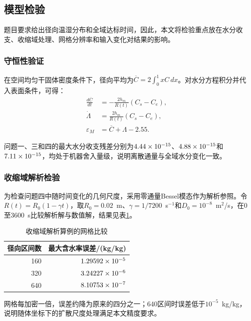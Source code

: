 \FloatBarrier
\subsection{模型检验}\label{sec:checks}
题目要求给出径向温湿分布和全域达标时间，因此，本文将检验重点放在水分收支、收缩域处理、网格分辨率和输入变化对结果的影响。

\subsubsection{守恒性验证}
在空间均匀干固体密度条件下，径向平均为$\overline C=2\int_0^1xC\,dx$。对水分方程积分并代入表面条件，可得：
\begin{equation}\label{eq:balance}
\begin{aligned}
\frac{d\overline C}{dt}&=-\frac{2h_m}{R(t)}(C_s-C_e),\\
\dot\Lambda&=\frac{2h_m}{R(t)}(C_s-C_e),\\
\varepsilon_M&=\overline C+\Lambda-2.55.
\end{aligned}
\end{equation}

问题一、三和四的最大水分收支残差分别为$4.44\times\nobreak10^{-15}$、$4.88\times\nobreak10^{-15}$和$7.11\times\nobreak10^{-15}$，均处于机器舍入量级，说明离散通量与全域水分变化一致。

\subsubsection{收缩域解析检验}
为检查问题四中随时间变化的几何尺度，采用零通量Bessel模态作为解析参照。令$R(t)=R_0(1-\gamma t)$，取$R_0=0.02$~m、$\gamma=1/7200$~s$^{-1}$和$D_0=10^{-8}$~m$^2$/s，在0至3600~s比较解析解与数值解，结果见表\ref{tab:moving-benchmark}。

\begin{table}[htbp]\centering\small
\caption{收缩域解析算例的网格比较}\label{tab:moving-benchmark}
\begin{tabular}{rr}
\toprule
径向区间数 & 最大含水率误差/(kg/kg)\\
\midrule
160 & $1.29592\times\nobreak10^{-5}$\\
320 & $3.24227\times\nobreak10^{-6}$\\
640 & $8.10753\times\nobreak10^{-7}$\\
\bottomrule
\end{tabular}
\end{table}

网格每加密一倍，误差约降为原来的四分之一；640区间时误差低于$10^{-5}$~kg/kg，说明随体坐标下的扩散尺度处理满足本文精度要求。

